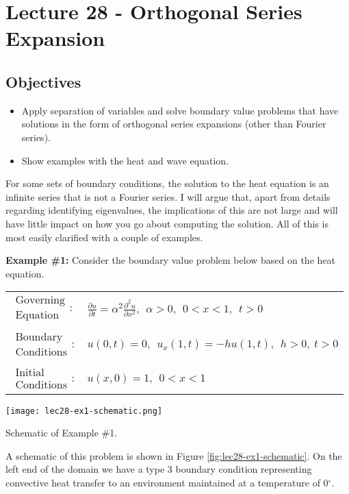 \chapter{Lecture 28 - Orthogonal Series Expansion}
\label{ch:lec28}
\section{Objectives}
\begin{itemize}
\item Apply separation of variables and solve boundary value problems that have solutions in the form of orthogonal series expansions (other than Fourier series).
\item Show examples with the heat and wave equation.
\end{itemize}
\setcounter{lstannotation}{0} %

For some sets of boundary conditions, the solution to the heat equation is an infinite series that is not a Fourier series.  I will argue that, apart from details regarding identifying eigenvalues, the implications of this are not large and will have little impact on how you go about computing the solution.  All of this is most easily clarified with a couple of examples.

\vspace{0.3cm}

\noindent\textbf{Example \#1:}  Consider the boundary value problem below based on the heat equation.
\begin{table}
\begin{tabular}{l l}
$\substack{\text{Governing} \\\text{Equation}}: $& $\frac{\partial u}{\partial t} = \alpha^2 \frac{\partial^2 u}{\partial x^2},  \ \ \alpha>0, \ \ 0<x<1, \ \ t>0$ \\
& \\
$\substack{\text{Boundary} \\ \text{Conditions}}: $& $u(0,t)=0, \ \ u_x(1,t) = -hu(1,t), \ \ h>0, \  t>0$\\
& \\
$\substack{\text{Initial} \\ \text{Conditions}}: $ & $u(x,0) = 1, \ \ 0<x<1 $ \\
\end{tabular}
\end{table}
\begin{marginfigure}
\texttt{[image: lec28-ex1-schematic.png]}
\caption{Schematic of Example \#1.}
\label{fig:lec28-ex1-schematic}
\end{marginfigure}
A schematic of this problem is shown in Figure \ref{fig:lec28-ex1-schematic}.  On the left end of the domain we have a type 3 boundary condition representing convective heat transfer to an environment maintained at a temperature of 0$^{\circ}$.

